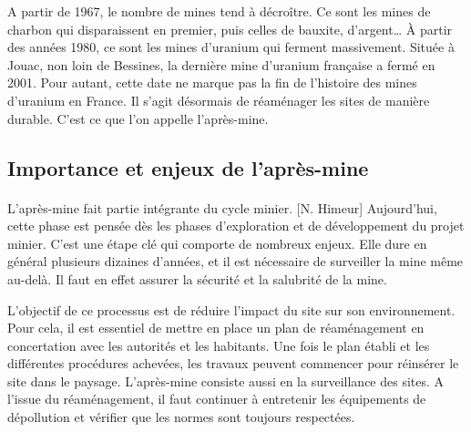 \documentclass{article}
\begin{document}



A partir de 1967, le nombre de mines tend à décroître. Ce sont les mines de charbon qui disparaissent en premier, puis celles de bauxite, d’argent… À partir des années 1980, ce sont les mines d’uranium qui ferment massivement. Située à Jouac, non loin de Bessines, la dernière mine d’uranium française a fermé en 2001. Pour autant, cette date ne marque pas la fin de l’histoire des mines d’uranium en France. Il s’agit désormais de réaménager les sites de manière durable. C’est ce que l’on appelle l’après-mine.




\subsection{Importance et enjeux de l'après-mine}
\paragraph{} L’après-mine fait partie intégrante du cycle minier. [N. Himeur] Aujourd’hui, cette phase est pensée dès les phases d’exploration et de développement du projet minier. C’est une étape clé qui comporte de nombreux enjeux. Elle dure en général plusieurs dizaines d’années, et il est nécessaire de surveiller la mine même au-delà. Il faut en effet assurer la sécurité et la salubrité de la mine.

L’objectif de ce processus est de réduire l’impact du site sur son environnement. Pour cela, il est essentiel de mettre en place un plan de réaménagement en concertation avec les autorités et les habitants. Une fois le plan établi et les différentes procédures achevées, les travaux peuvent commencer pour réinsérer le site dans le paysage. L’après-mine consiste aussi en la surveillance des sites. A l’issue du réaménagement, il faut continuer à entretenir les équipements de dépollution et vérifier que les normes sont toujours respectées.
\end{document}
